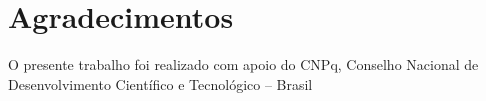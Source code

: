 \documentclass[brazil]{beamer}
\begin{document}
\section{Agradecimentos}
\begin{frame}
\centering
O presente trabalho foi realizado com apoio do CNPq, Conselho Nacional de Desenvolvimento Científico e Tecnológico – Brasil
\end{frame}
\end{document}
